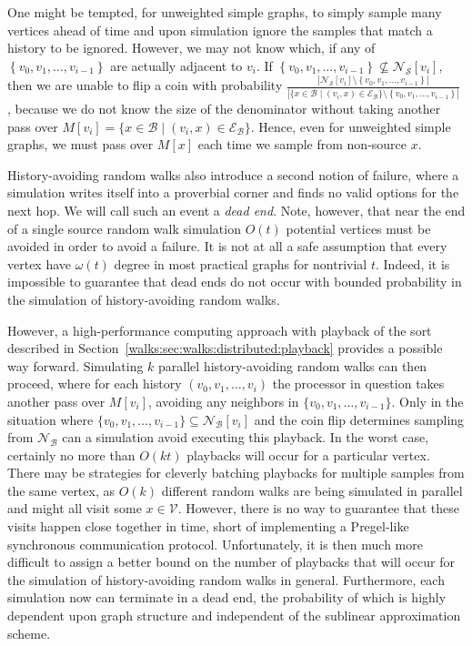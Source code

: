 \documentclass[10]{report}
\begin{document}
One might be tempted, for unweighted simple graphs, to simply sample many vertices ahead of time and upon simulation ignore the samples that match a history to be ignored.
However, we may not know which, if any of $\left \{ v_0, v_1, \dots, v_{i-1} \right \}$ are actually adjacent to $v_i$. 
If $\left \{ v_0, v_1, \dots, v_{i-1} \right \} \not \subseteq \mathcal{N}_\mathcal{S}[v_i]$, then we are unable to flip a coin with probability 
$\frac{|\mathcal{N}_\mathcal{S}[v_i] \setminus \left \{ v_0, v_1, \dots, v_{i-1} \right \}|}
{|\{ x \in \mathcal{B} \mid (v_i, x) \in \mathcal{E}_\mathcal{B} \} \setminus \left \{ v_0, v_1, \dots, v_{i-1} \right \}|}$
, because we do not know the size of the denominator without taking another pass over $M[v_i] = \{ x \in \mathcal{B} \mid (v_i, x) \in \mathcal{E}_\mathcal{B} \}$.
Hence, even for unweighted simple graphs, we must pass over $M[x]$ each time we sample from non-source $x$.

History-avoiding random walks also introduce a second notion of failure, where a simulation writes itself into a proverbial corner and finds no valid options for the next hop. 
We will call such an event a \emph{dead end}. 
Note, however, that near the end of a single source random walk simulation $O(t)$ potential vertices must be avoided in order to avoid a failure. 
It is not at all a safe assumption that every vertex have $\omega(t)$ degree in most practical graphs for nontrivial $t$.
Indeed, it is impossible to guarantee that dead ends do not occur with bounded probability in the simulation of history-avoiding random walks.  

However, a high-performance computing approach with playback of the sort described in Section~\ref{walks:sec:walks:distributed:playback} provides a possible way forward.
Simulating $k$ parallel history-avoiding random walks can then proceed, where for each history $(v_0, v_1, \dots, v_i)$ the processor in question takes another pass over $M[v_i]$, avoiding any neighbors in $\{v_0, v_1, \dots, v_{i - 1}\}$. 
Only in the situation where $\{v_0, v_1, \dots, v_{i-1}\} \subseteq \mathcal{N}_\mathcal{B}[v_i]$ and the coin flip determines sampling from $\mathcal{N}_\mathcal{B}$ can a simulation avoid executing this playback.
In the worst case, certainly no more than $O(kt)$ playbacks will occur for a particular vertex.
There may be strategies for cleverly batching playbacks for multiple samples from the same vertex, as $O(k)$ different random walks are being simulated in parallel and might all visit some $x \in \mathcal{V}$.
However, there is no way to guarantee that these visits happen close together in time, short of implementing a Pregel-like synchronous communication protocol.
Unfortunately, it is then much more difficult to assign a better bound on the number of playbacks that will occur for the simulation of history-avoiding random walks in general.
Furthermore, each simulation now can terminate in a dead end, the probability of which is highly dependent upon graph structure and independent of the sublinear approximation scheme.
\end{document}
